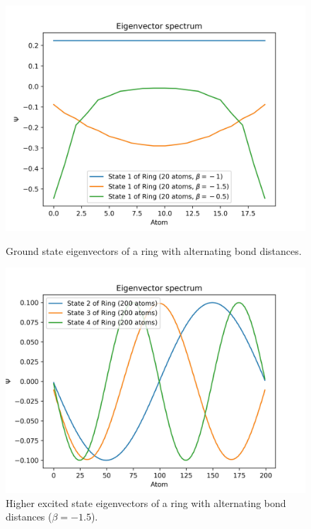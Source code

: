 \documentclass{article}
\begin{document}
\begin{figure}[ht]
    \centering
    \begin{minipage}{0.47\textwidth}
        \centering
        \includegraphics[width=\textwidth]{Figures/ring_beta_eigenvectors.jpg}
        \caption{Ground state eigenvectors of a ring with alternating bond distances.}
        \label{fig:ring_alternating_beta_vec}
    \end{minipage}
    \hfill
    \begin{minipage}{0.47\textwidth}
        \centering
        \includegraphics[width=\textwidth]{Figures/ring_beta_eigenvectors_2.jpg}
        \caption{Higher excited state eigenvectors of a ring with alternating bond distances ($\beta = -1.5$).}
        \label{fig:ring_alternating_beta_vec_2}
    \end{minipage}
\end{figure}
\end{document}
